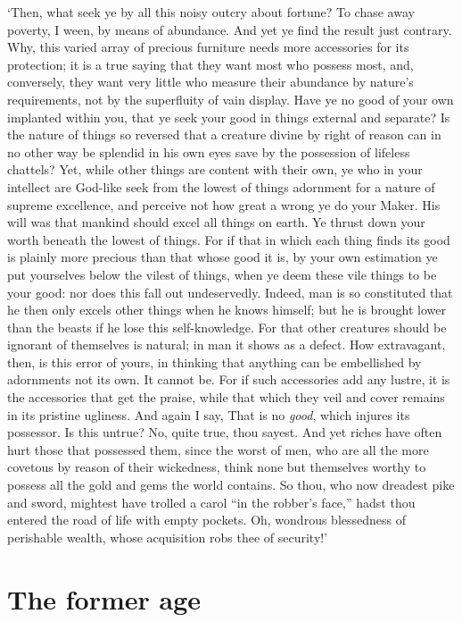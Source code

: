 \documentclass[12pt]{book}
\begin{document}
`Then, what seek ye by all this noisy outcry about fortune? To chase
away poverty, I ween, by means of abundance. And yet ye find the result
just contrary. Why, this varied array of precious furniture needs more
accessories for its protection; it is a true saying that they want most
who possess most, and, conversely, they want very little who measure
their abundance by nature's requirements, not by the superfluity of vain
display. Have ye no good of your own implanted within you, that ye seek
your good in things external and separate? Is the nature of things so
reversed that a creature divine by right of reason can in no other way
be splendid in his own eyes save by the possession of lifeless chattels?
Yet, while other things are content with their own, ye who in your
intellect are God-like seek from the lowest of things adornment for a
nature of supreme excellence, and perceive not how great a wrong ye do
your Maker. His will was that mankind should excel all things on earth.
Ye thrust down your worth beneath the lowest of things. For if that in
which each thing finds its good is plainly more precious than that whose
good it is, by your own estimation ye put yourselves below the vilest of
things, when ye deem these vile things to be your good: nor does this
fall out undeservedly. Indeed, man is so constituted that he then only
excels other things when he knows himself; but he is brought lower than
the beasts if he lose this self-knowledge. For that other creatures
should be ignorant of themselves is natural; in man it shows as a
defect. How extravagant, then, is this error of yours, in thinking that
anything can be embellished by adornments not its own. It cannot be. For
if such accessories add any lustre, it is the accessories that get the
praise, while that which they veil and cover remains in its pristine
ugliness. And again I say, That is no \emph{good}, which injures its
possessor. Is this untrue? No, quite true, thou sayest. And yet riches
have often hurt those that possessed them, since the worst of men, who
are all the more covetous by reason of their wickedness, think none but
themselves worthy to possess all the gold and gems the world contains.
So thou, who now dreadest pike and sword, mightest have trolled a carol
``in the robber's face,'' hadst thou entered the road of life with empty
pockets. Oh, wondrous blessedness of perishable wealth, whose
acquisition robs thee of security!'




\section{The former age}
\end{document}
